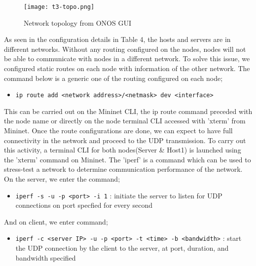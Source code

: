 \documentclass{article}
\begin{document}
    	\begin{figure}[h]
        		\centering
        		\texttt{[image: t3-topo.png]}
        		\caption{Network topology from ONOS GUI}
        		\label{fig:t3-1}
    	\end{figure}
\newpage
\par As seen in the configuration details in Table 4, the hosts and servers are in different networks. Without any routing configured on the nodes, nodes will not be able to communicate with nodes in a different network. To solve this issue, we configured static routes on each node with information of the other network. The command below is a generic one of the routing configured on each node; 
	\begin{itemize}
		\centering
		\item \texttt{ip route add <network address>/<netmask>  dev <interface>}
	\end{itemize}
This can be carried out on the Mininet CLI, the ip route command preceded with the node name or directly on the node terminal CLI accessed with 'xterm' from Mininet. Once the route configurations are done, we can expect to have full connectivity in the network and proceed to the UDP transmission. To carry out this activity, a terminal CLI for both nodes(Server \& Host1) is launched using the 'xterm' command on Mininet. The 'iperf' is a command which can be used to stress-test a network to determine communication performance of the network. \\ On the server, we enter the command; 
	\begin{itemize}
		\item \texttt{iperf -s -u -p <port> -i 1} : initiate the server to listen for UDP connections on port specfied for every second
	\end{itemize}
And on client, we enter command;
	\begin{itemize}
		\item \texttt{iperf -c <server IP> -u -p <port> -t <time> -b <bandwidth>} : start the UDP connection by the client to the server, at port, duration, and bandwidth specified
	\end{itemize}
\end{document}
